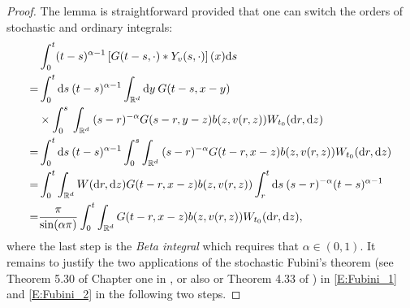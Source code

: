\documentclass[12pt]{report}
\theoremstyle{plain}
\theoremstyle{definition}
\numberwithin{equation}{section}
\newcommand{\R}{\mathbb{R}}
\newcommand{\ud}{\ensuremath{ \mathrm{d} }}
\begin{document}
\begin{proof}
	The lemma is straightforward provided that one can switch the orders of stochastic and ordinary
	integrals:
	\begin{align}
	& \int_0^t (t-s)^{\alpha-1}\left[G(t-s,\cdot)*Y_v(s,\cdot)\right](x) \ud s \notag                                                     \\
	= & \int_0^t \ud s\: (t-s)^{\alpha-1}\int_{\R^d} \ud y\: G(t-s,x-y) \notag                                                                  \\
	& \times \int_0^s\: \int_{\R^d} \: (s-r)^{-\alpha}G(s-r,y-z)b(z,v(r,z))W_{t_0}(\ud r,\ud z) \notag                                      \\
	= & \int_0^t \ud s\: (t-s)^{\alpha-1} \int_0^s \int_{\R^d} \: (s-r)^{-\alpha}G(t-r,x-z)b(z,v(r,z))W_{t_0}(\ud r,\ud z) \label{E:Fubini_1} \\
	= & \int_0^t \int_{\R^d} W(\ud r,\ud z)G(t-r,x-z)b(z,v(r,z)) \int_r^t \ud s\: (s-r)^{-\alpha} (t-s)^{\alpha-1} \label{E:Fubini_2}         \\
	= & \dfrac{\pi}{\sin(\alpha \pi)}\int_0^t  \int_{\R^d} G(t-r,x-z)b(z,v(r,z)) W_{t_0}(\ud r,\ud z),\notag
	\end{align}
	where the last step is the {\it Beta integral} which requires that $\alpha\in (0,1)$. It remains
	to justify the two applications of the stochastic Fubini's theorem (see Theorem 5.30 of Chapter
	one in \cite{dalang.khoshnevisan.ea:09:minicourse}, or also \cite{walsh:86:introduction} or
	Theorem 4.33 of \cite{da-prato.zabczyk:14:stochastic}) in \eqref{E:Fubini_1} and
	\eqref{E:Fubini_2} in the following two steps. \bigskip
	

\end{proof}
\end{document}
